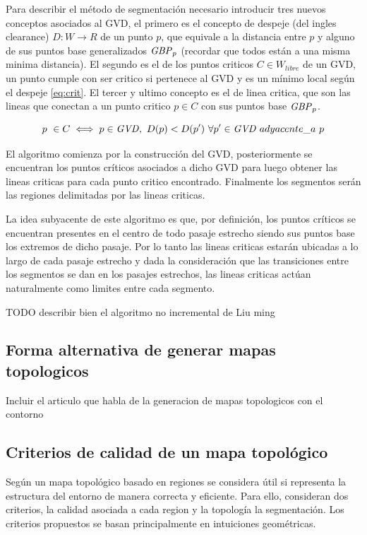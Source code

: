 Para describir el método de segmentación necesario introducir tres nuevos conceptos asociados al GVD, el primero es el concepto de despeje (del ingles clearance) $D : W \rightarrow R$ de un punto $p$, que equivale a la distancia entre $p$ y alguno de sus puntos base generalizados $\mathit{GBP}_p$ (recordar que todos están a una misma minima distancia). El segundo es el de los puntos criticos $C\in W_{libre}$ de un GVD, un punto cumple con ser critico si pertenece al GVD y es un mínimo local según el despeje \ref{eq:crit}. El tercer y ultimo concepto es el de linea critica, que son las lineas que conectan a un punto critico $p \in C$ con sus puntos base $\mathit{GBP}_p$.

\begin{equation}
  p\ \in C \iff p \in \mathit{GVD},\ D(p) < D(p')\ \forall p' \in \mathit{GVD} \ adyacente\_a\ p \label{eq:crit}
\end{equation}

El algoritmo comienza por la construcción del GVD, posteriormente se encuentran los puntos críticos asociados a dicho GVD para luego obtener las lineas criticas para cada punto critico encontrado. Finalmente los segmentos serán las regiones delimitadas por las lineas criticas.

La idea subyacente de este algoritmo es que, por definición, los puntos críticos se encuentran presentes en el centro de todo pasaje estrecho siendo sus puntos base los extremos de dicho pasaje. Por lo tanto las lineas criticas estarán ubicadas a lo largo de cada pasaje estrecho y dada la consideración que las transiciones entre los segmentos se dan en los pasajes estrechos, las lineas criticas actúan naturalmente como limites entre cada segmento.

TODO describir bien el algoritmo no incremental de Liu ming

\subsection{Forma alternativa de generar mapas topologicos}
Incluir el articulo que habla de la generacion de mapas topologicos con el contorno 

\subsection{Criterios de calidad de un mapa topológico}
Según \cite{Liu2015} un mapa topológico basado en regiones se considera útil si representa la estructura del entorno de manera correcta y eficiente. Para ello, consideran dos criterios, la calidad asociada a cada region y la topología la segmentación. Los criterios propuestos se basan principalmente en intuiciones geométricas. 

